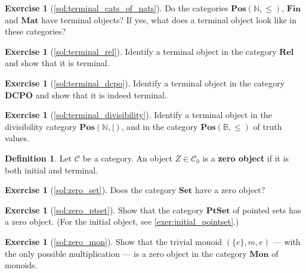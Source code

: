 \documentclass[a4paper,11pt, oneside,titlepage=false]{scrbook}
\theoremstyle{plain}
\theoremstyle{definition}
\newtheorem{dfn}[thm]{Definition}
\newtheorem{exer}[thm]{Exercise}
\newcommand{\Cat}[1]{\mathcal{#1}}
\newcommand{\CC}{\Cat{C}}
\newcommand{\Catb}[1]{\mathbf{#1}}
\newcommand{\SET}{\Catb{Set}}
\newcommand{\PTSET}{\Catb{PtSet}}
\newcommand{\POS}{\Catb{Pos}}
\newcommand{\MON}{\Catb{Mon}}
\newcommand{\DCPO}{\Catb{DCPO}}
\newcommand{\MAT}{\Catb{Mat}}
\newcommand{\SKELFINSET}{\Catb{Fin}}
\newcommand{\REL}{\Catb{Rel}}
\newcommand{\Ob}[1]{{#1}_0}
\newcommand{\NN}{\ensuremath{\mathbb{N}}}
\begin{document}
\begin{exer}[\cref{sol:terminal_cats_of_nats}]\label{exer:terminal_cats_of_nats}
  Do the categories $\POS(\NN, \leq)$, $\SKELFINSET$ and $\MAT$ have terminal objects? If yes, what does a terminal object look like in these categories?
\end{exer}

\begin{exer}[\cref{sol:terminal_rel}] \label{exer:terminal_rel}
  Identify a terminal object in the category $\REL$ and show that it is terminal.
\end{exer}

\begin{exer}[\cref{sol:terminal_dcpo}]\label{exer:terminal_dcpo}
  Identify a terminal object in the category $\DCPO$ and show that it is indeed terminal.
\end{exer}

\begin{exer}[\cref{sol:terminal_divisibility}]\label{exer:terminal_divisibility}
  Identify a terminal object in the divisibility category $\POS(\NN, \mid)$,
  and in the category $\POS(\mathbb{B}, \leq)$ of truth values.
\end{exer}

\begin{dfn}\label{dfn:zero-object}
  Let $\CC$ be a category. An object $Z \in \Ob{\CC}$ is a \textbf{zero object}
  if it is both initial and terminal.
\end{dfn}

\begin{exer}[\cref{sol:zero_set}]\label{exer:zero_set}
  Does the category $\SET$ have a zero object?
\end{exer}

\begin{exer}[\cref{sol:zero_ptset}]\label{exer:zero_ptset}
  Show that the category $\PTSET$ of pointed sets has a zero object.
  (For the initial object, see \cref{exer:initial_pointset}.)
\end{exer}

\begin{exer}[\cref{sol:zero_mon}]\label{exer:zero_mon}
  Show that the trivial monoid $(\{e\}, m, e)$ --- with the only possible
  multiplication --- is a zero object in the category $\MON$ of monoids.
\end{exer}
\end{document}
